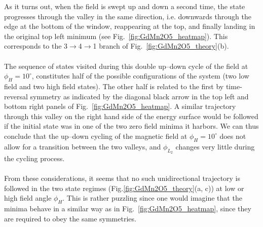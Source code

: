 As it turns out, when the field is swept up and down a second time, the state progresses through the valley in the same direction, i.e. downwards through the edge at the bottom of the window, reappearing at the top, and finally landing in the original top left minimum (see Fig.~\ref{fig:GdMn2O5_heatmap}).
This corresponds to the 3$\rightarrow$4$\rightarrow$1 branch of Fig.~\ref{fig:GdMn2O5_theory}(b).
\\\\
The sequence of states visited during this double up--down cycle of the field at $\phi_H = 10^\circ$, constitutes half of the possible configurations of the system (two low field and two high field states).
The other half is related to the first by time-reversal symmetry as indicated by the diagonal black arrow in the top left and bottom right panels of Fig.~\ref{fig:GdMn2O5_heatmap}.
A similar trajectory through this valley on the right hand side of the energy surface would be followed if the initial state was in one of the two zero field minima it harbors. 
We can thus conclude that the up--down cycling of the magnetic field at $\phi_H=10^\circ$ does not allow for a transition between the two valleys, and $\phi_{L_2}$ changes very little during the cycling process.
\\\\
From these considerations, it seems that no such unidirectional trajectory is followed in the two state regimes (Fig.\ref{fig:GdMn2O5_theory}(a, c)) at low or high field angle $\phi_H$.
This is rather puzzling since one would imagine that the minima behave in a similar way as in Fig.~\ref{fig:GdMn2O5_heatmap}, since they are required to obey the same symmetries.

